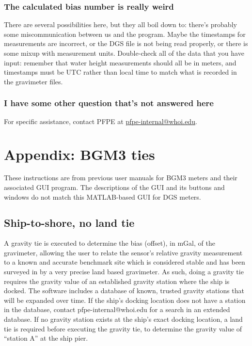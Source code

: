 \documentclass{pfpe-manual}
\begin{document}
\subsubsection{The calculated bias number is really weird}
There are several possibilities here, but they all boil down to: there's probably some miscommunication between us and the program. Maybe the timestamps for measurements are incorrect, or the DGS file is not being read properly, or there is some mixup with measurement units. Double-check all of the data that you have input: remember that water height measurements should all be in meters, and timestamps must be UTC rather than local time to match what is recorded in the gravimeter files.

\subsubsection{I have some other question that's not answered here}
For specific assistance, contact PFPE at \href{mailto:pfpe-internal@whoi.edu}{pfpe-internal@whoi.edu}.

\section{Appendix: BGM3 ties}
These instructions are from previous user manuals for BGM3 meters and their associated GUI program. The descriptions of the GUI and its buttons and windows do not match this MATLAB-based GUI for DGS meters.

\subsection{Ship-to-shore, no land tie}
A gravity tie is executed to determine the bias (offset), in mGal, of the gravimeter, allowing the user to relate the sensor’s relative gravity measurement to a known and accurate benchmark site which is considered stable and has been surveyed in by a very precise land based gravimeter. As such, doing a gravity tie requires the gravity value of an established gravity station where the ship is docked. The software includes a database of known, trusted gravity stations that will be expanded over time. If the ship’s docking location does not have a station in the database, contact pfpe-internal@whoi.edu for a search in an extended database. If no gravity station exists at the ship’s exact docking location, a land tie is required before executing the gravity tie, to determine the gravity value of “station A” at the ship pier. 
\end{document}
